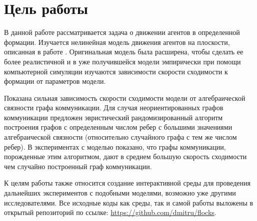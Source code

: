 
\chapter{Цель работы}
В данной работе рассматривается задача о движении агентов в определенной формации. Изучается нелинейная модель движения агентов на плоскости, описанная в работе \cite{veerman2005flocks}. Оригинальная модель была расширена, чтобы сделать ее более реалистичной и в уже получившейся модели эмпирически при помощи компьютерной симуляции изучаются зависимости скорости сходимости к формации от параметров модели. 

Показана сильная зависимость скорости сходимости модели от алгебраической связности графа коммуникации. Для случая неориентированных графов коммуникации предложен эвристический рандомизированный алгоритм построения графов с определенным числом ребер с большими значениями алгебраической связности (относительно случайного графа с тем же числом ребер). В экспериментах с моделью показано, что графы коммуникации, порожденные этим алгоритмом, дают в среднем б\emph{о}льшую скорость сходимости чем случайно построенный граф коммуникации.

К целям работы также относится создание интерактивной среды для проведения дальнейших экспериментов с подобными моделями, возможно уже другими исследователями. Все исходные коды как среды, так и самой работы выложены в открытый репозиторий по ссылке:
\url{https://github.com/dmitru/flocks}.

\clearpage